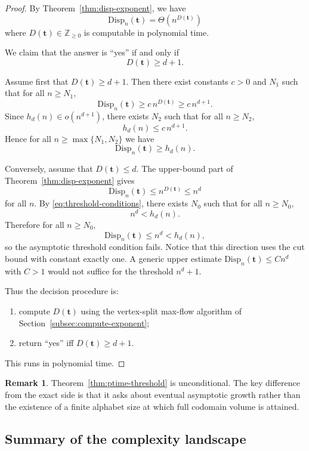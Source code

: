 \documentclass[11pt]{article}
\theoremstyle{definition}
\newtheorem{remark}{Remark}[section]
\theoremstyle{plain}
\newcommand{\Disp}{\mathrm{Disp}}
\begin{document}
\begin{proof}
By Theorem~\ref{thm:disp-exponent}, we have
\[
\Disp_n(\mathbf t)=\Theta(n^{D(\mathbf t)})
\]
where $D(\mathbf t)\in\mathbb Z_{\ge 0}$ is computable in polynomial time.

We claim that the answer is ``yes'' if and only if
\[
D(\mathbf t)\ge d+1.
\]

Assume first that $D(\mathbf t)\ge d+1$.
Then there exist constants $c>0$ and $N_1$ such that for all $n\ge N_1$,
\[
\Disp_n(\mathbf t)\ge c\,n^{D(\mathbf t)}\ge c\,n^{d+1}.
\]
Since $h_d(n)\in o(n^{d+1})$, there exists $N_2$ such that for all $n\ge N_2$,
\[
h_d(n)\le c\,n^{d+1}.
\]
Hence for all $n\ge \max\{N_1,N_2\}$ we have
\[
\Disp_n(\mathbf t)\ge h_d(n).
\]

Conversely, assume that $D(\mathbf t)\le d$.
The upper-bound part of Theorem~\ref{thm:disp-exponent} gives
\[
\Disp_n(\mathbf t)\le n^{D(\mathbf t)}\le n^d
\]
for all $n$.
By \eqref{eq:threshold-conditions}, there exists $N_0$ such that for all $n\ge N_0$,
\[
n^d<h_d(n).
\]
Therefore for all $n\ge N_0$,
\[
\Disp_n(\mathbf t)\le n^d<h_d(n),
\]
so the asymptotic threshold condition fails.
Notice that this direction uses the cut bound with constant exactly one.  A generic upper estimate
$\Disp_n(\mathbf t)\le Cn^d$ with $C>1$ would not suffice for the threshold $n^d+1$.

Thus the decision procedure is:
\begin{enumerate}[leftmargin=*]
\item compute $D(\mathbf t)$ using the vertex-split max-flow algorithm of Section~\ref{subsec:compute-exponent};
\item return ``yes'' iff $D(\mathbf t)\ge d+1$.
\end{enumerate}
This runs in polynomial time.
\end{proof}

\begin{remark}
Theorem~\ref{thm:ptime-threshold} is unconditional.
The key difference from the exact side is that it asks about eventual asymptotic growth rather than the existence of
a finite alphabet size at which full codomain volume is attained.
\end{remark}

\subsection{Summary of the complexity landscape}
\label{subsec:summary-landscape}
\end{document}

